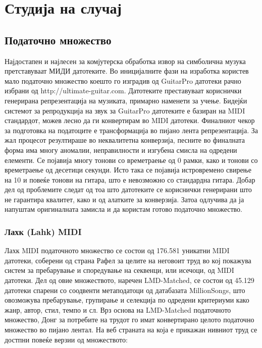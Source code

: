 \chapter{Студија на случај}
\label{ch:studija}

\section{Податочно множество}

Најдостапен и најлесен за комјутерска обработка извор на симболична музука претставуваат МИДИ датотеките. Во иницијалните фази на изработка користев мало податочно множество коешто го изградив од GuitarPro датотеки рачно избрани од http://ultimate-guitar.com. Датотеките преставуваат кориснички генерирана репрезентација на музиката, примарно наменети за учење. Бидејќи системот за репродукција на звук за GuitarPro датотеките е базиран на MIDI стандардот, можев лесно да ги конвертирам во MIDI датотеки. Финалниот чекор за подготовка на податоците е трансформација во пијано лента репрезентација. За жал процесот резултираше во неквалитетна конверзија, песните во финалната форма има многу аномалии, неправилности и изгубена смисла на одредени елементи. Се појавија многу тонови со времетраење од 0 рамки, како и тонови со времетраење од десетици секунди. Исто така се појавија истровремено свирење на 10 и повеќе тонови на гитара, што е невозможно со стандардна гитара. Добар дел од проблемите следат од тоа што датотеките се кориснички генерирани што не гарантира квалитет, како и од алатките за конверзија. Затоа одлучива да ја напуштам оригиналната замисла и да користам готово податочно множество.

\subsection{Лахк (Lahk) MIDI}

Лахк MIDI податочното множество се состои од 176.581 уникатни MIDI датотеки, соберени од страна Рафел за целите на неговоит труд \cite{Raffel2016} во кој покажува систем за пребарување и споредување на секвенци, или исечоци, од MIDI датотеки. Дел од овие множеството, наречен LMD-Matched, се состои од 45.129 датотеки спарени со соодвенти метаподатоци од датабазата MillionSongs, што овозможува пребарување, групирање и селекција по одредени критериуми како жанр, автор, стил, темпо и сл. 
Врз основа на LMD-Matched податочното множество, Донг за потребите на трудот \cite{Dong2017} го имат конвертирано целото податочно множество во пијано лентал. На веб страната на која е прикажан нивниот труд се достпни повеќе верзии од множеството:

